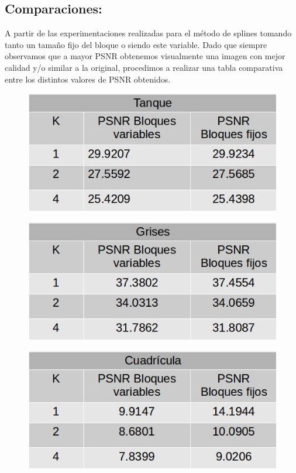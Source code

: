 \documentclass[a4paper]{article}
\begin{document}
\subsection{Comparaciones:}
A partir de las experimentaciones realizadas para el método de splines tomando tanto un tamaño fijo del bloque o siendo este variable. Dado que siempre observamos que a mayor PSNR obtenemos visualmente una imagen con mejor calidad y/o similar a la original, procedimos a realizar una tabla comparativa entre los distintos valores de PSNR obtenidos.  

 \begin{figure}[H]
    \centering
    \includegraphics[scale=0.4]{imagenes/tanqueMetodosDif.jpg}
	\label{autoe}
    \end{figure}

 \begin{figure}[H]
    \centering
    \includegraphics[scale=0.4]{imagenes/grisesMetodosDif.jpg}
	\label{autoe}
    \end{figure}
    
    
     \begin{figure}[H]
    \centering
    \includegraphics[scale=0.4]{imagenes/cuadriculaMetodosDif.jpg}
	\label{autoe}
    \end{figure}
    
\end{document}
